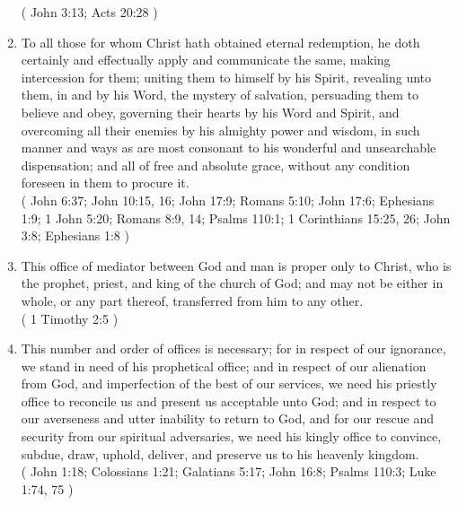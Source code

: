 \documentclass[12pt,a4paper]{book}
\begin{document}
\begin{enumerate}
( John 3:13; Acts 20:28 )
\item
\label{ch-Chr-med-8}
To all those for whom Christ hath obtained eternal redemption, he doth certainly and effectually apply and communicate the same, making intercession for them; uniting them to himself by his Spirit, revealing unto them, in and by his Word, the mystery of salvation, persuading them to believe and obey, governing their hearts by his Word and Spirit, and overcoming all their enemies by his almighty power and wisdom, in such manner and ways as are most consonant to his wonderful and unsearchable dispensation; and all of free and absolute grace, without any condition foreseen in them to procure it.\\
( John 6:37; John 10:15, 16; John 17:9; Romans 5:10; John 17:6; Ephesians 1:9; 1 John 5:20; Romans 8:9, 14; Psalms 110:1; 1 Corinthians 15:25, 26; John 3:8; Ephesians 1:8 )
\item
\label{ch-Chr-med-9}
This office of mediator between God and man is proper only to Christ, who is the prophet, priest, and king of the church of God; and may not be either in whole, or any part thereof, transferred from him to any other.\\
( 1 Timothy 2:5 )
\item
\label{ch-Chr-med-10}
This number and order of offices is necessary; for in respect of our ignorance, we stand in need of his prophetical office; and in respect of our alienation from God, and imperfection of the best of our services, we need his priestly office to reconcile us and present us acceptable unto God; and in respect to our averseness and utter inability to return to God, and for our rescue and security from our spiritual adversaries, we need his kingly office to convince, subdue, draw, uphold, deliver, and preserve us to his heavenly kingdom.\\
( John 1:18; Colossians 1:21; Galatians 5:17; John 16:8; Psalms 110:3; Luke 1:74, 75 )
\end{enumerate}
\end{document}
